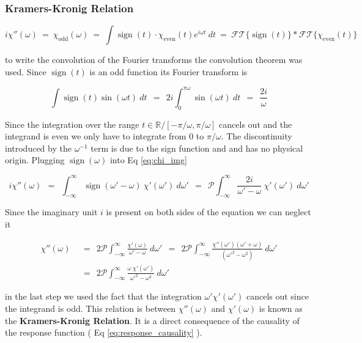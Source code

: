 \documentclass[10pt]{report}
\numberwithin{equation}{chapter}
\newcommand{\refEq}[1]{
  Eq  \ref{#1}
}
\DeclareMathOperator{\sign}{sign}
\newcommand{\FT}[1]{	%
  \mathcal{FT}\{ #1 \}
}
\newcommand{\princVal}{  %
  \mathcal{P}
}
\begin{document}
\subsubsection{Kramers-Kronig Relation}

\begin{equation} \label{eq:chi_img}
  i \chi''(\omega) ~=~ \chi_\text{odd}(\omega) ~=~ \int \sign(t) \cdot \chi_\text{even}(t) e^{i\omega t}\ dt ~=~ \FT{\sign(t)} \ast \FT{\chi_\text{even}(t)}
\end{equation}

to write the convolution of the Fourier transforms the convolution theorem was used. Since $\sign(t)$ is an odd function its Fourier transform is

\begin{equation}
  \int \sign(t) \sin(\omega t)\ dt ~~=~~ 2i \int^{\pi \omega}_0 \sin(\omega t)\ dt ~~=~~ \frac{2i}{\omega}
\end{equation}

Since the integration over the range $t \in \mathbb{R}/[-\pi/\omega, \pi/\omega]$  cancels out and the integrand is even we only have to integrate from $0$ to $\pi/\omega$. 
The discontinuity introduced by the $\omega^{-1}$ term is due to the sign function and and has no physical origin. Plugging $\sign(\omega)$ into \refEq{eq:chi_img}

\begin{equation}
  i \chi''(\omega) ~~=~~ \int_{-\infty}^\infty \sign(\omega' - \omega)\ \chi'(\omega')\ d\omega' ~~=~~
  \princVal \int_{-\infty}^\infty \frac{2i}{\omega' - \omega}\ \chi'(\omega')\ d\omega'
\end{equation}

Since the imaginary unit $i$ is present on both sides of the equation we can neglect it 

\begin{align}
  \chi''(\omega) ~~& =~~ 2 \princVal \int_{-\infty}^\infty \frac{\chi'(\omega)}{\omega' - \omega}\ d\omega'
  ~~=~~ 2\princVal \int_{-\infty}^\infty \frac{\chi''(\omega')(\omega' + \omega)}{(\omega'^2 - \omega^2)}\ d\omega' \nonumber \\
  ~~& =~~ 2\princVal \int_{-\infty}^\infty \frac{\omega\ \chi'(\omega')}{\omega'^2-\omega^2}\ d\omega'
\end{align}

in the last step we used the fact that the integration $\omega' \chi'(\omega')$ cancels out since the integrand is odd. This relation is between $\chi''(\omega)$ and $\chi'(\omega)$ is known as the \textbf{Kramers-Kronig Relation}. It is a direct consequence of the causality of the response function (\refEq{eq:response_causality}). 
\end{document}
